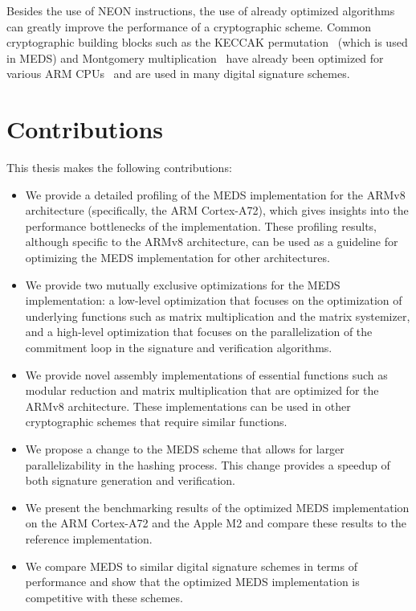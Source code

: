 \documentclass[11pt,a4paper]{report}
\theoremstyle{definition}
\begin{document}
Besides the use of NEON instructions, the use of already optimized algorithms can greatly improve the performance of a cryptographic scheme. Common cryptographic building blocks such as the KECCAK permutation~\cite{bertoni2013keccak} (which is used in MEDS) and Montgomery multiplication~\cite{montgomery1985modular} have already been optimized for various ARM CPUs~\cite{becker2022hybrid,bos2014montgomery,seo2015montgomery} and are used in many digital signature schemes.

\section{Contributions}
This thesis makes the following contributions:
\begin{itemize}
  \item We provide a detailed profiling of the MEDS implementation for the ARMv8 architecture (specifically, the ARM Cortex-A72), which gives insights into the performance bottlenecks of the implementation. These profiling results, although specific to the ARMv8 architecture, can be used as a guideline for optimizing the MEDS implementation for other architectures.
  \item We provide two mutually exclusive optimizations for the MEDS implementation: a low-level optimization that focuses on the optimization of underlying functions such as matrix multiplication and the matrix systemizer, and a high-level optimization that focuses on the parallelization of the commitment loop in the signature and verification algorithms.
  \item We provide novel assembly implementations of essential functions such as modular reduction and matrix multiplication that are optimized for the ARMv8 architecture. These implementations can be used in other cryptographic schemes that require similar functions.
  \item We propose a change to the MEDS scheme that allows for larger parallelizability in the hashing process. This change provides a speedup of both signature generation and verification.
  \item We present the benchmarking results of the optimized MEDS implementation on the ARM Cortex-A72 and the Apple M2 and compare these results to the reference implementation.
  \item We compare MEDS to similar digital signature schemes in terms of performance and show that the optimized MEDS implementation is competitive with these schemes.
\end{itemize}
\end{document}
